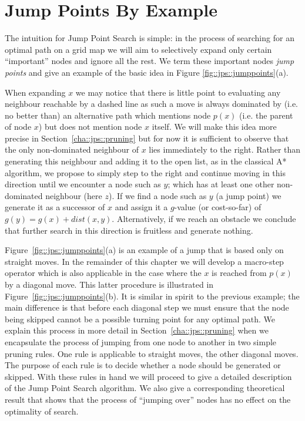 \section{Jump Points By Example}
\label{cha::jps::jumppoints}
The intuition for Jump Point Search is simple: in the process of searching
for an optimal path on a grid map we will aim to selectively expand only
certain ``important'' nodes and ignore all the rest.
We term these important nodes \emph{jump points} and give an example of the 
basic idea in Figure \ref{fig::jps::jumppoints}(a).

When expanding $x$ we may notice that there is little point to evaluating any
neighbour reachable by a dashed line as such a move is always dominated by
(i.e. no better than) an alternative path which mentions node $p(x)$ (i.e. the 
parent of node $x$) but does not mention node $x$ itself.
We will make this idea more precise in Section~\ref{cha::jps::pruning} but for
now it is sufficient to observe that the only non-dominated neighbour of $x$
lies immediately to the right.  Rather than generating this neighbour and
adding it to the open list, as in the classical A* algorithm, we propose to
simply step to the right and continue moving in this direction until we
encounter a node such as $y$; which has at least one other non-dominated
neighbour (here $z$).  If we find a node such as $y$ (a jump point) we
generate it as a successor of $x$ and assign it a $g$-value (or cost-so-far)
of $g(y) = g(x) + dist(x, y)$.  Alternatively, if we reach an obstacle we
conclude that further search in this direction is fruitless and generate
nothing.
\par
Figure~\ref{fig::jps::jumppoints}(a) is an example of a jump that is based
only on straight moves. In the remainder of this chapter we will develop  
a macro-step operator which is also applicable in the case where the $x$ is reached
from $p(x)$ by a diagonal move. This latter procedure is illustrated in 
Figure~\ref{fig::jps::jumppoints}(b). It is similar in spirit to the previous example;
the main difference is that before each diagonal step we must ensure that the node 
being skipped cannot be a possible turning point for any optimal path. 
We explain this process in more detail in Section~\ref{cha::jps::pruning} when we encapsulate
the process of jumping from one node to another in two simple pruning rules.
One rule is applicable to straight moves, the other diagonal moves.
The purpose of each rule is to decide whether a node should be generated or skipped. 
With these rules in hand we will proceed to give a detailed description of the Jump
Point Search algorithm. We also give a corresponding theoretical result that shows 
that the process of ``jumping over'' nodes has no effect on the optimality of search.

